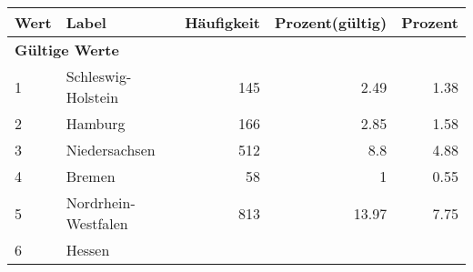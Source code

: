      \begin{longtable}{lXrrr}
     \toprule
     \textbf{Wert} & \textbf{Label} & \textbf{Häufigkeit} & \textbf{Prozent(gültig)} & \textbf{Prozent} \\
     \endhead
     \midrule
     \multicolumn{5}{l}{\textbf{Gültige Werte}}\\

     1 &
     \multicolumn{1}{X}{ Schleswig-Holstein   } &


       \num{145} &
       \num[round-mode=places,round-precision=2]{2.49} &
         \num[round-mode=places,round-precision=2]{1.38} \\

     2 &
     \multicolumn{1}{X}{ Hamburg   } &


       \num{166} &
       \num[round-mode=places,round-precision=2]{2.85} &
         \num[round-mode=places,round-precision=2]{1.58} \\

     3 &
     \multicolumn{1}{X}{ Niedersachsen   } &


       \num{512} &
       \num[round-mode=places,round-precision=2]{8.8} &
         \num[round-mode=places,round-precision=2]{4.88} \\

     4 &
     \multicolumn{1}{X}{ Bremen   } &


       \num{58} &
       \num[round-mode=places,round-precision=2]{1} &
         \num[round-mode=places,round-precision=2]{0.55} \\

     5 &
     \multicolumn{1}{X}{ Nordrhein-Westfalen   } &


       \num{813} &
       \num[round-mode=places,round-precision=2]{13.97} &
         \num[round-mode=places,round-precision=2]{7.75} \\

     6 &
     \multicolumn{1}{X}{ Hessen   } &



\end{longtable}
